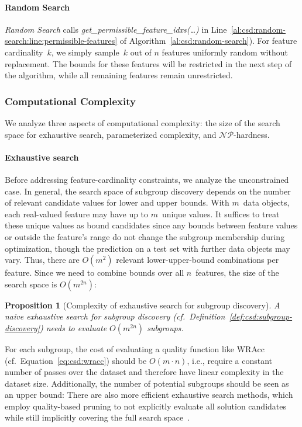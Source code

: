 \documentclass{article}
\newtheorem{proposition}{Proposition}
\theoremstyle{definition}
\begin{document}
\paragraph{Random Search}

\emph{Random Search} calls \emph{get\_permissible\_feature\_idxs(\dots)} in Line~\ref{al:csd:random-search:line:permissible-features} of Algorithm~\ref{al:csd:random-search}).
For feature cardinality~$k$, we simply sample~$k$ out of $n$ features uniformly random without replacement.
The bounds for these features will be restricted in the next step of the algorithm, while all remaining features remain unrestricted.

\subsubsection{Computational Complexity}
\label{sec:csd:approach:cardinality:complexity}

We analyze three aspects of computational complexity:
the size of the search space for exhaustive search, parameterized complexity, and $\mathcal{NP}$-hardness.

\paragraph{Exhaustive search}

Before addressing feature-cardinality constraints, we analyze the unconstrained case.
In general, the search space of subgroup discovery depends on the number of relevant candidate values for lower and upper bounds.
With $m$~data objects, each real-valued feature may have up to $m$~unique values.
It suffices to treat these unique values as bound candidates since any bounds between feature values or outside the feature's range do not change the subgroup membership during optimization, though the prediction on a test set with further data objects may vary.
Thus, there are $O(m^2)$ relevant lower-upper-bound combinations per feature.
Since we need to combine bounds over all $n$~features, the size of the search space is $O(m^{2n})$:
%
\begin{proposition}[Complexity of exhaustive search for subgroup discovery]
	A naive exhaustive search for subgroup discovery (cf.~Definition~\ref{def:csd:subgroup-discovery}) needs to evaluate $O(m^{2n})$ subgroups.
	\label{prop:csd:complexity-unconstrained-exhaustive}
\end{proposition}
%
For each subgroup, the cost of evaluating a quality function like WRAcc (cf.~Equation~\ref{eq:csd:wracc}) should be $O(m \cdot n)$, i.e., require a constant number of passes over the dataset and therefore have linear complexity in the dataset size.
Additionally, the number of potential subgroups should be seen as an upper bound:
There are also more efficient exhaustive search methods, which employ quality-based pruning to not explicitly evaluate all solution candidates while still implicitly covering the full search space~\cite{atzmueller2015subgroup}.
\end{document}
